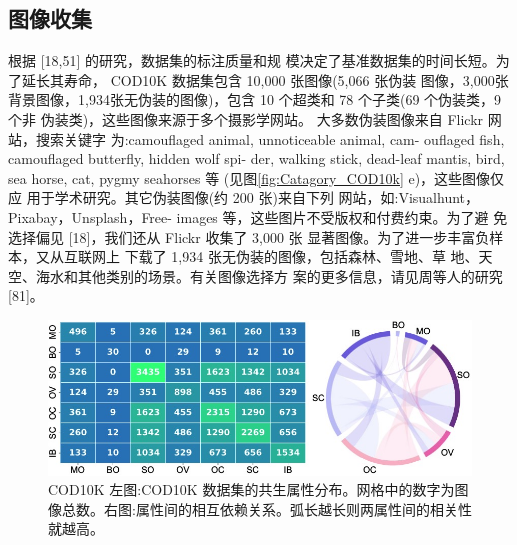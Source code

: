 \documentclass[final]{cvpr}
\renewcommand{\figref}[1]{图\ref{#1}}
\begin{document}
\subsection{图像收集}
根据 [18,51] 的研究，数据集的标注质量和规 模决定了基准数据集的时间长短。为了延长其寿命， COD10K 数据集包含 10,000 张图像(5,066 张伪装 图像，3,000张背景图像，1,934张无伪装的图像)，包含 10 个超类和 78 个子类(69 个伪装类，9 个非 伪装类)，这些图像来源于多个摄影学网站。
大多数伪装图像来自 Flickr 网站，搜索关键字 为:camouflaged animal, unnoticeable animal, cam- ouflaged fish, camouflaged butterfly, hidden wolf spi- der, walking stick, dead-leaf mantis, bird, sea horse, cat, pygmy seahorses 等 (见\figref{fig:Catagory_COD10k} e)，这些图像仅应 用于学术研究。其它伪装图像(约 200 张)来自下列 网站，如:Visualhunt，Pixabay，Unsplash，Free- images 等，这些图片不受版权和付费约束。为了避 免选择偏见 [18]，我们还从 Flickr 收集了 3,000 张 显著图像。为了进一步丰富负样本，又从互联网上 下载了 1,934 张无伪装的图像，包括森林、雪地、草 地、天空、海水和其他类别的场景。有关图像选择方 案的更多信息，请见周等人的研究 [81]。

\begin{figure}[tp]
    \centering
    \includegraphics[width=0.98\columnwidth]{COD_Zh_translate/figures/Inter_relation_COD10k.png}\small
    \caption{COD10K 左图:COD10K 数据集的共生属性分布。网格中的数字为图像总数。右图:属性间的相互依赖关系。弧长越长则两属性间的相关性就越高。}
    \label{fig:inter_connection_COD10k}
\end{figure}
\end{document}
